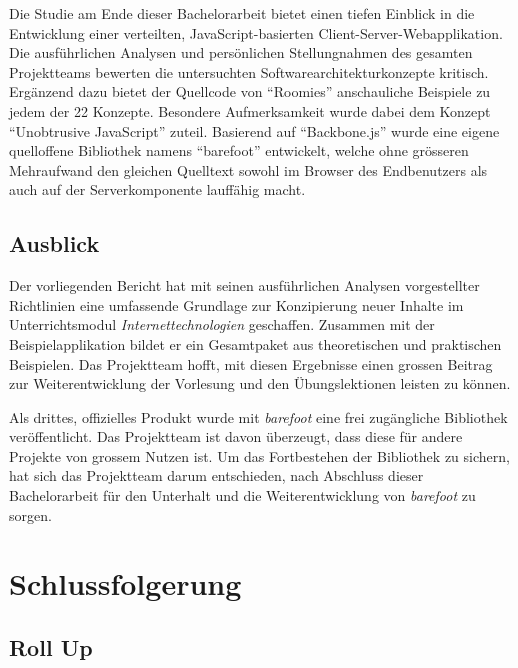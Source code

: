 Die Studie am Ende dieser Bachelorarbeit bietet einen tiefen Einblick in die Entwicklung einer verteilten, JavaScript-basierten Client-Server-Webapplikation. Die ausführlichen Analysen und persönlichen Stellungnahmen des gesamten Projektteams bewerten die untersuchten Softwarearchitekturkonzepte kritisch. Ergänzend dazu bietet der Quellcode von ``Roomies'' anschauliche Beispiele zu jedem der 22 Konzepte. Besondere Aufmerksamkeit wurde dabei dem Konzept ``Unobtrusive JavaScript'' zuteil. Basierend auf ``Backbone.js'' wurde eine eigene quelloffene Bibliothek namens ``barefoot'' entwickelt, welche ohne grösseren Mehraufwand den gleichen Quelltext sowohl im Browser des Endbenutzers als auch auf der Serverkomponente lauffähig macht.


\section{Ausblick}

Der vorliegenden Bericht hat mit seinen ausführlichen Analysen vorgestellter Richtlinien eine umfassende Grundlage zur Konzipierung neuer Inhalte im Unterrichtsmodul \emph{Internettechnologien} geschaffen. Zusammen mit der Beispielapplikation bildet er ein Gesamtpaket aus theoretischen und praktischen Beispielen. Das Projektteam hofft, mit diesen Ergebnisse einen grossen Beitrag zur Weiterentwicklung der Vorlesung und den Übungslektionen leisten zu können.

Als drittes, offizielles Produkt wurde mit \emph{barefoot} eine frei zugängliche Bibliothek veröffentlicht. Das Projektteam ist davon überzeugt, dass diese für andere Projekte von grossem Nutzen ist. Um das Fortbestehen der Bibliothek zu sichern, hat sich das Projektteam darum entschieden, nach Abschluss dieser Bachelorarbeit für den Unterhalt und die Weiterentwicklung von \emph{barefoot} zu sorgen.

















\chapter{Schlussfolgerung}

\section*{Roll Up}

